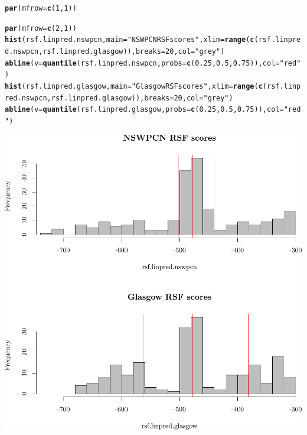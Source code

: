 \documentclass{article}\usepackage[]{graphicx}\usepackage[]{color}
\makeatletter
\def\maxwidth{ %
  \ifdim\Gin@nat@width>\linewidth
    \linewidth
  \else
    \Gin@nat@width
  \fi
}
\newcommand{\hlnum}[1]{\textcolor[rgb]{0.686,0.059,0.569}{#1}}%
\newcommand{\hlstr}[1]{\textcolor[rgb]{0.192,0.494,0.8}{#1}}%
\newcommand{\hlstd}[1]{\textcolor[rgb]{0.345,0.345,0.345}{#1}}%
\newcommand{\hlkwc}[1]{\textcolor[rgb]{0.333,0.667,0.333}{#1}}%
\newcommand{\hlkwd}[1]{\textcolor[rgb]{0.737,0.353,0.396}{\textbf{#1}}}%
\newenvironment{kframe}{%
 \def\at@end@of@kframe{}%
 \ifinner\ifhmode%
  \def\at@end@of@kframe{\end{minipage}}%
  \begin{minipage}{\columnwidth}%
 \fi\fi%
 \def\FrameCommand##1{\hskip\@totalleftmargin \hskip-\fboxsep
 \colorbox{shadecolor}{##1}\hskip-\fboxsep
     \hskip-\linewidth \hskip-\@totalleftmargin \hskip\columnwidth}%
 \MakeFramed {\advance\hsize-\width
   \@totalleftmargin\z@ \linewidth\hsize
   \@setminipage}}%
 {\par\unskip\endMakeFramed%
 \at@end@of@kframe}
\newenvironment{knitrout}{}{} %
\makeatother
\begin{document}
\begin{knitrout}
{}


\begin{kframe}\begin{alltt}
\hlkwd{par}\hlstd{(}\hlkwc{mfrow} \hlstd{=} \hlkwd{c}\hlstd{(}\hlnum{1}\hlstd{,} \hlnum{1}\hlstd{))}

\hlkwd{par}\hlstd{(}\hlkwc{mfrow} \hlstd{=} \hlkwd{c}\hlstd{(}\hlnum{2}\hlstd{,} \hlnum{1}\hlstd{))}
\hlkwd{hist}\hlstd{(rsf.linpred.nswpcn,} \hlkwc{main} \hlstd{=} \hlstr{"NSWPCN RSF scores"}\hlstd{,} \hlkwc{xlim} \hlstd{=} \hlkwd{range}\hlstd{(}\hlkwd{c}\hlstd{(rsf.linpred.nswpcn, rsf.linpred.glasgow)),} \hlkwc{breaks} \hlstd{=} \hlnum{20}\hlstd{,} \hlkwc{col} \hlstd{=} \hlstr{"grey"}\hlstd{)}
\hlkwd{abline}\hlstd{(}\hlkwc{v} \hlstd{=} \hlkwd{quantile}\hlstd{(rsf.linpred.nswpcn,} \hlkwc{probs} \hlstd{=} \hlkwd{c}\hlstd{(}\hlnum{0.25}\hlstd{,} \hlnum{0.5}\hlstd{,} \hlnum{0.75}\hlstd{)),} \hlkwc{col} \hlstd{=} \hlstr{"red"}\hlstd{)}
\hlkwd{hist}\hlstd{(rsf.linpred.glasgow,} \hlkwc{main} \hlstd{=} \hlstr{"Glasgow RSF scores"}\hlstd{,} \hlkwc{xlim} \hlstd{=} \hlkwd{range}\hlstd{(}\hlkwd{c}\hlstd{(rsf.linpred.nswpcn, rsf.linpred.glasgow)),} \hlkwc{breaks} \hlstd{=} \hlnum{20}\hlstd{,} \hlkwc{col} \hlstd{=} \hlstr{"grey"}\hlstd{)}
\hlkwd{abline}\hlstd{(}\hlkwc{v} \hlstd{=} \hlkwd{quantile}\hlstd{(rsf.linpred.glasgow,} \hlkwc{probs} \hlstd{=} \hlkwd{c}\hlstd{(}\hlnum{0.25}\hlstd{,} \hlnum{0.5}\hlstd{,} \hlnum{0.75}\hlstd{)),} \hlkwc{col} \hlstd{=} \hlstr{"red"}\hlstd{)}
\end{alltt}
\end{kframe}

{\centering \includegraphics[width=\maxwidth]{figure/05-score-hists-3} 

}
\end{knitrout}
\end{document}
